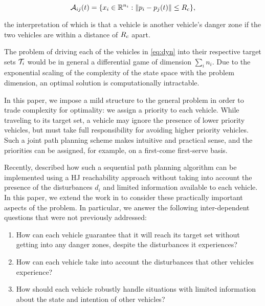 \begin{equation}
\mathcal{A}_{ij}(t) = \{x_i \in \mathbb{R}^{n_i}: \|p_i - p_j(t)\| \le R_c \},
\end{equation}

\noindent the interpretation of which is that a vehicle is another vehicle's danger zone if the two vehicles are within a distance of $R_c$ apart.

The problem of driving each of the vehicles in \eqref{eq:dyn} into their respective target sets $\mathcal{T}_i$ would be in general a differential game of dimension $\sum_i n_i$. Due to the exponential scaling of the complexity of the state space with the problem dimension, an optimal solution is computationally intractable.

In this paper, we impose a mild structure to the general problem in order to trade complexity for optimality: we assign a priority to each vehicle. While traveling to its target set, a vehicle may ignore the presence of lower priority vehicles, but must take full responsibility for avoiding higher priority vehicles. Such a joint path planning scheme makes intuitive and practical sense, and the priorities can be assigned, for example, on a first-come first-serve basis.

Recently, \cite{Chen15} described how such a sequential path planning algorithm can be implemented using a HJ reachability approach without taking into account the presence of the disturbances $d_i$ and limited information available to each vehicle. In this paper, we extend the work in \cite{Chen15} to consider these practically important aspects of the problem. In particular, we answer the following inter-dependent questions that were not previously addressed:

\begin{enumerate}
\item How can each vehicle guarantee that it will reach its target set without getting into any danger zones, despite the disturbances it experiences?
\item How can each vehicle take into account the disturbances that other vehicles experience?
\item How should each vehicle robustly handle situations with limited information about the state and intention of other vehicles?
\end{enumerate}
